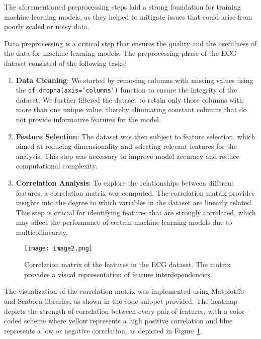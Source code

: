 \documentclass{report}
\begin{document}
The aforementioned preprocessing steps laid a strong foundation for training machine learning models, as they helped to mitigate issues that could arise from poorly scaled or noisy data.

Data preprocessing is a critical step that ensures the quality and the usefulness of the data for machine learning models. The preprocessing phase of the ECG dataset consisted of the following tasks:

\begin{enumerate}
    \item \textbf{Data Cleaning}: We started by removing columns with missing values using the \texttt{df.dropna(axis='columns')} function to ensure the integrity of the dataset. We further filtered the dataset to retain only those columns with more than one unique value, thereby eliminating constant columns that do not provide informative features for the model.
    
    \item \textbf{Feature Selection}: The dataset was then subject to feature selection, which aimed at reducing dimensionality and selecting relevant features for the analysis. This step was necessary to improve model accuracy and reduce computational complexity.
    
    \item \textbf{Correlation Analysis}: To explore the relationships between different features, a correlation matrix was computed. The correlation matrix provides insights into the degree to which variables in the dataset are linearly related. This step is crucial for identifying features that are strongly correlated, which may affect the performance of certain machine learning models due to multicollinearity.
\end{enumerate}
    
\begin{figure}[ht]
    \centering
    \texttt{[image: image2.png]} 
    \caption{Correlation matrix of the features in the ECG dataset. The matrix provides a visual representation of feature interdependencies.}
    \label{fig:correlation_matrix}
\end{figure}

The visualization of the correlation matrix was implemented using Matplotlib and Seaborn libraries, as shown in the code snippet provided. The heatmap depicts the strength of correlation between every pair of features, with a color-coded scheme where yellow represents a high positive correlation and blue represents a low or negative correlation, as depicted in Figure \ref{fig:correlation_matrix}.
\end{document}
